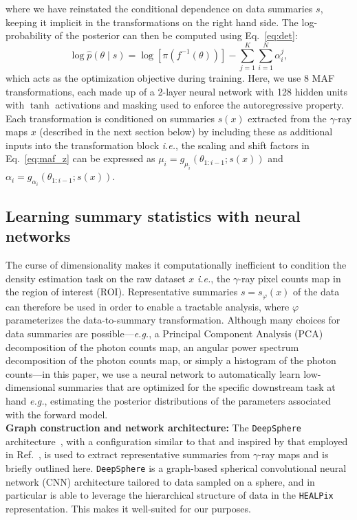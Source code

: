 \documentclass[prd,aps,10pt,nofootinbib,twocolumn,superscriptaddress,preprintnumbers,balancelastpage,longbibliography]{revtex4-1}
\begin{document}
where we have reinstated the conditional dependence on data summaries $s$, keeping it implicit in the transformations on the right hand side. The log-probability of the posterior can then be computed using Eq.~\eqref{eq:det}:
\begin{equation}
\label{eq:objective}
\log \hat{p}({\theta}\mid s) = \log \left[\pi\left(f^{-1}({\theta})\right)\right]-\sum_{j=1}^{K} \sum_{i=1}^{N} \alpha_{i}^{j},
\end{equation}
which acts as the optimization objective during training. Here, we use 8 MAF transformations, each made up of a 2-layer neural network with 128 hidden units with $\tanh$ activations and masking used to enforce the autoregressive property. Each transformation is conditioned on summaries $s(x)$ extracted from the $\gamma$-ray maps $x$ (described in the next section below) by including these as additional inputs into the transformation block \emph{i.e.}, the scaling and shift factors in Eq.~\eqref{eq:maf_z} can be expressed as $\mu_{i}=g_{\mu_{i}}\left({\theta}_{1: i-1} ; {s(x)}\right)$ and $\alpha_i = g_{\alpha_{i}}\left({\theta}_{1: i-1} ; {s(x)}\right)$.

\subsection{Learning summary statistics with neural networks}

The curse of dimensionality makes it computationally inefficient to condition the density estimation task on the raw dataset $x$ \emph{i.e.}, the $\gamma$-ray pixel counts map in the region of interest (ROI). Representative summaries $s = s_\varphi(x)$ of the data can therefore be used in order to enable a tractable analysis, where $\varphi$ parameterizes the data-to-summary transformation. Although many choices for data summaries are possible---\emph{e.g.}, a Principal Component Analysis (PCA) decomposition of the photon counts map, an angular power spectrum decomposition of the photon counts map, or simply a histogram of the photon counts---in this paper, we use a neural network to automatically learn low-dimensional summaries that are optimized for the specific downstream task at hand \emph{e.g.}, estimating the posterior distributions of the parameters associated with the forward model. \\

\noindent
\textbf{Graph construction and network architecture:}
The \texttt{DeepSphere} architecture~\cite{defferrard2020deepsphere,Perraudin:2018rbt,deepsphere_rlgm}, with a configuration similar to that and inspired by that employed in Ref.~\cite{List:2020mzd}, is used to extract representative summaries from $\gamma$-ray maps and is briefly outlined here. \texttt{DeepSphere} is a graph-based spherical convolutional neural network (CNN) architecture tailored to data sampled on a sphere, and in particular is able to leverage the hierarchical structure of data in the \texttt{HEALPix} representation. This makes it well-suited for our purposes.
\end{document}
